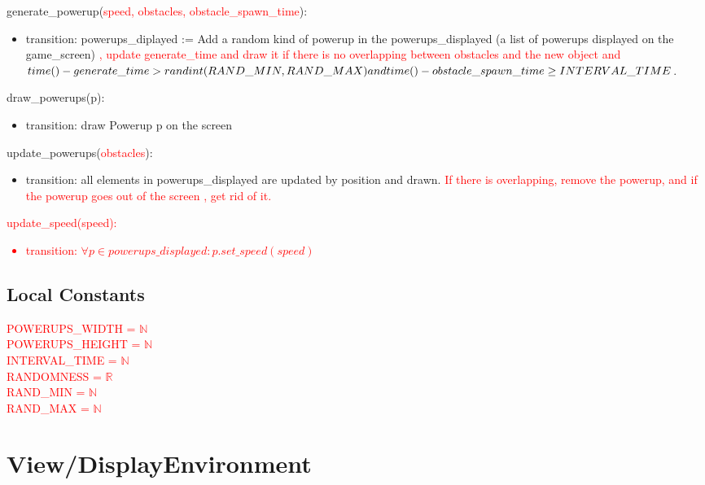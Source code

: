 \documentclass[12pt]{article}
\begin{document}
\noindent generate\_powerup(\textcolor{red}{speed, obstacles, obstacle\_spawn\_time}):
\begin{itemize}
    \item transition: powerups\_diplayed := Add a random kind of powerup in the powerups\_displayed (a list of powerups displayed on the game\_screen) \textcolor{red}{, update generate\_time and draw it if there is no overlapping between obstacles and the new object and $time() - generate\_time > randint(RAND\_MIN,RAND\_MAX)\\ and time() - obstacle\_spawn\_time \geq INTERVAL\_TIME$}. 
\end{itemize}

\noindent draw\_powerups(p): 
\begin{itemize}
    \item transition: draw Powerup p on the screen
\end{itemize}

\noindent update\_powerups(\textcolor{red}{obstacles}):
\begin{itemize}
    \item transition: all elements in powerups\_displayed are updated by position and drawn. \textcolor{red}{If there is overlapping, remove the powerup, and if the powerup goes out of the screen , get rid of it.} 
\end{itemize}

\noindent \textcolor{red}{update\_speed(speed): 
\begin{itemize}
    \item transition: $\forall p \in powerups\_displayed: p.set\_speed(speed)$
\end{itemize}}
\subsection* {Local Constants}
\textcolor{red}{
POWERUPS\_WIDTH = $\mathbb{N}$\\
POWERUPS\_HEIGHT = $\mathbb{N}$\\
INTERVAL\_TIME = $\mathbb{N}$\\
RANDOMNESS = $\mathbb{R}$\\
RAND\_MIN = $\mathbb{N}$\\
RAND\_MAX = $\mathbb{N}$}
\newpage
\section*{View/DisplayEnvironment}
\end{document}
